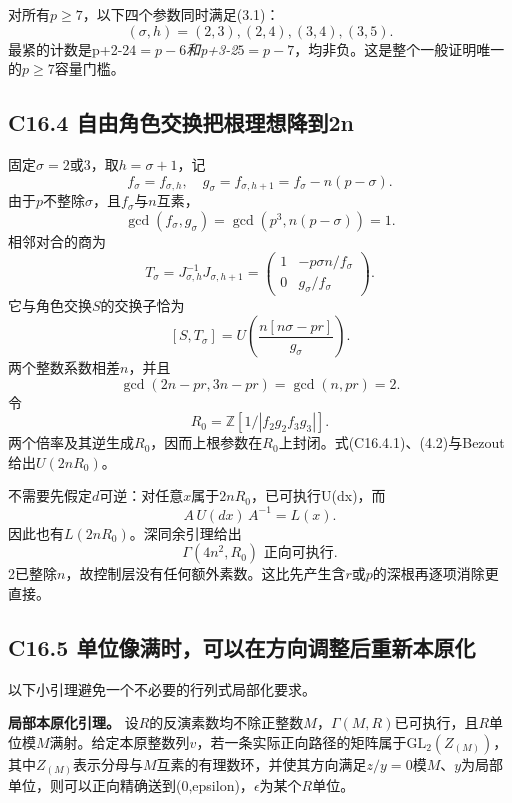 {对所有\ensuremath{p\ge 7}，以下四个参数同时满足(3.1)：} \[
(\sigma,h)=(2,3),(2,4),(3,4),(3,5).
\tag{C16.3.3}
\] {最紧的计数是p+2-2}\emph{{\ensuremath{4=p-6}和p+3-2}}{\ensuremath{5=p-7}，均非负。这是整个一般证明唯一的\ensuremath{p\ge 7}容量门槛。}

\subsection*{\texorpdfstring{{C16.4} {自由角色交换把根理想降到2n}}{C16.4 自由角色交换把根理想降到2n}}\label{C16-h116}

{固定\ensuremath{\sigma =2}或3，取\ensuremath{h=\sigma +1}，记} \[
f_\sigma=f_{\sigma,h},\quad
g_\sigma=f_{\sigma,h+1}=f_\sigma-n(p-\sigma).
\] {由于\ensuremath{p}不整除\ensuremath{\sigma }，且\ensuremath{f_\sigma }与\ensuremath{n}互素，} \[
\gcd(f_\sigma,g_\sigma)
=\gcd(p^3,n(p-\sigma))=1.
\] {相邻对合的商为} \[
T_\sigma=J_{\sigma,h}^{-1}J_{\sigma,h+1}
=\begin{pmatrix}1&-p\sigma n/f_\sigma\\0&g_\sigma/f_\sigma\end{pmatrix}.
\] {它与角色交换\ensuremath{S}的交换子恰为} \[
\boxed{[S,T_\sigma]=
U\left(\frac{n[n\sigma-pr]}{g_\sigma}\right).}
\tag{C16.4.1}
\] {两个整数系数相差\ensuremath{n}，并且} \[
\gcd(2n-pr,3n-pr)=\gcd(n,pr)=2.
\tag{C16.4.2}
\] {令} \[
R_0=\mathbb Z[1/|f_2g_2f_3g_3|].
\] {两个倍率及其逆生成\ensuremath{R_{0}}，因而上根参数在\ensuremath{R_{0}}上封闭。式(C16.4.1)、(4.2)与Bezout给出\ensuremath{U(2nR_{0})}。}

{不需要先假定\ensuremath{d}可逆：对任意\ensuremath{x}属于\ensuremath{2nR_{0}}，已可执行U(dx)，而} \[
A\,U(dx)\,A^{-1}=L(x).
\] {因此也有\ensuremath{L(2nR_{0})}。深同余引理给出} \[
\boxed{\Gamma(4n^2,R_0)\text{ 正向可执行}.}
\tag{C16.4.3}
\] {2已整除\ensuremath{n}，故控制层没有任何额外素数。这比先产生含\ensuremath{r}或\ensuremath{p}的深根再逐项消除更直接。}

\subsection*{\texorpdfstring{{C16.5} {单位像满时，可以在方向调整后重新本原化}}{C16.5 单位像满时，可以在方向调整后重新本原化}}\label{C16-h117}

{以下小引理避免一个不必要的行列式局部化要求。}

\textbf{{局部本原化引理。}} {设\ensuremath{R}的反演素数均不除正整数\ensuremath{M}，\ensuremath{\Gamma (M,R)}已可执行，且\ensuremath{R}单位模\ensuremath{M}满射。给定本原整数列\ensuremath{v}，若一条实际正向路径的矩阵属于\ensuremath{\mathrm{GL}_{2}(Z_(M))}，其中\ensuremath{Z_(M)}表示分母与\ensuremath{M}互素的有理数环，并使其方向满足\ensuremath{z/y=0}模\ensuremath{M}、\ensuremath{y}为局部单位，则可以正向精确送到(0,epsilon)，\ensuremath{\epsilon }为某个\ensuremath{R}单位。}


